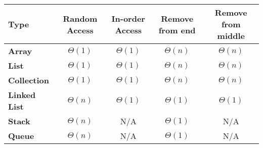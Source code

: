 \documentclass{article}
\providecommand{\tabularnewline}{\\}
\begin{document}
\begin{center}
{\small{}\medskip{}
}{\small\par}
\par\end{center}

\begin{center}
{\small{}}%
\begin{tabular}{|l|c|c|c|c|}
\hline 
\textbf{\small{}Type} & \textbf{\small{}Random Access} & \textbf{\small{}In-order Access} & \textbf{\small{}Remove from end} & \textbf{\small{}Remove from middle}\tabularnewline
\hline 
\hline 
\textbf{\small{}Array} & {\small{}$\Theta(1)$} & {\small{}$\Theta(1)$} & {\small{}$\Theta(n)$} & {\small{}$\Theta(n)$}\tabularnewline
\hline 
\textbf{\small{}List} & {\small{}$\Theta(1)$} & {\small{}$\Theta(1)$} & {\small{}$\Theta(n)$} & {\small{}$\Theta(n)$}\tabularnewline
\hline 
\textbf{\small{}Collection} & {\small{}$\Theta(1)$} & {\small{}$\Theta(1)$} & {\small{}$\Theta(n)$} & {\small{}$\Theta(n)$}\tabularnewline
\hline 
\textbf{\small{}Linked List} & {\small{}$\Theta(n)$} & {\small{}$\Theta(1)$} & {\small{}$\Theta(1)$} & {\small{}$\Theta(1)$}\tabularnewline
\hline 
\textbf{\small{}Stack} & {\small{}$\Theta(n)$} & {\small{}N/A } & {\small{}$\Theta(1)$} & {\small{}N/A}\tabularnewline
\hline 
\textbf{\small{}Queue} & {\small{}$\Theta(n)$} & {\small{}N/A } & {\small{}$\Theta(1)$} & {\small{}N/A}\tabularnewline
\hline 
\end{tabular}{\small\par}
\par\end{center}
\end{document}
